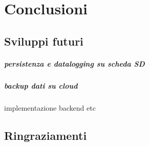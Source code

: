 \documentclass[12pt,a4paper]{report}
\begin{document}
\chapter{Conclusioni}
\section{Sviluppi futuri}
\paragraph{persistenza e datalogging su scheda SD}
\paragraph{backup dati su cloud} implementazione backend etc
\section{Ringraziamenti}
\end{document}

